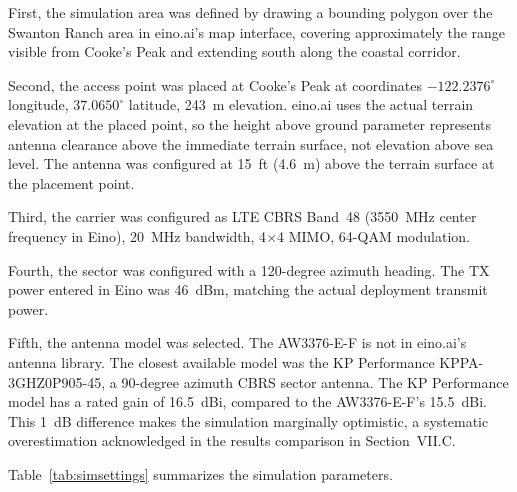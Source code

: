 \documentclass[
    left=1.5in,
    right=1.25in,
    top=1.25in,
    bottom=1.25in
]{CalPolySeniorProject}
\begin{document}
First, the simulation area was defined by drawing a bounding polygon over the
Swanton Ranch area in eino.ai's map interface, covering approximately the range
visible from Cooke's Peak and extending south along the coastal corridor.

Second, the access point was placed at Cooke's Peak at coordinates
$-122.2376^{\circ}$ longitude, $37.0650^{\circ}$ latitude, 243~m elevation.
eino.ai uses the actual terrain elevation at the placed point, so the height
above ground parameter represents antenna clearance above the immediate terrain
surface, not elevation above sea level. The antenna was configured at 15~ft
(4.6~m) above the terrain surface at the placement point.

Third, the carrier was configured as LTE CBRS Band~48 (3550~MHz center frequency
in Eino), 20~MHz bandwidth, 4$\times$4 MIMO, 64-QAM modulation.

Fourth, the sector was configured with a 120-degree azimuth heading. The TX
power entered in Eino was 46~dBm, matching the actual deployment transmit power.

Fifth, the antenna model was selected. The AW3376-E-F is not in eino.ai's
antenna library. The closest available model was the KP Performance
KPPA-3GHZ0P905-45, a 90-degree azimuth CBRS sector antenna. The KP Performance
model has a rated gain of 16.5~dBi, compared to the AW3376-E-F's 15.5~dBi. This
1~dB difference makes the simulation marginally optimistic, a systematic
overestimation acknowledged in the results comparison in Section~VII.C.

Table~\ref{tab:simsettings} summarizes the simulation parameters.
\end{document}
